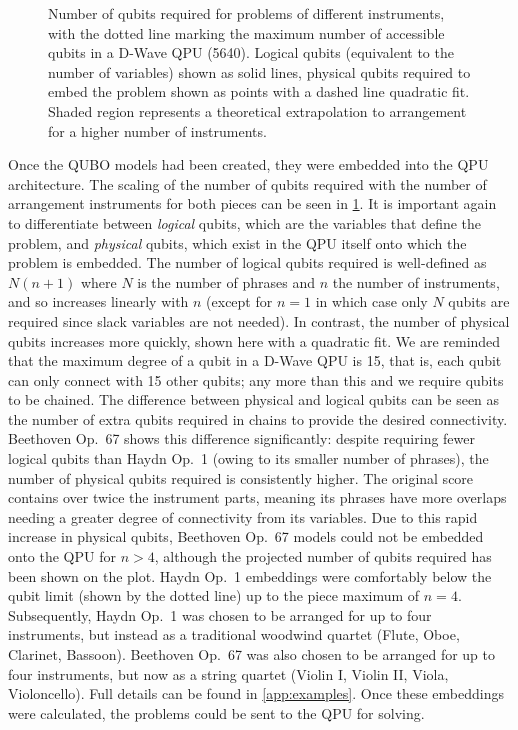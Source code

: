 \documentclass[twocolumn]{article}
\theoremstyle{definition}
\begin{document}
\begin{figure}[!t]
    \centering\footnotesize
    
    \caption{Number of qubits required for problems of different instruments, with the dotted line marking the maximum number of accessible qubits in a D-Wave QPU (\num{5640}). Logical qubits (equivalent to the number of variables) shown as solid lines, physical qubits required to embed the problem shown as points with a dashed line quadratic fit. Shaded region represents a theoretical extrapolation to arrangement for a higher number of instruments.}
    \label{fig:qubits}
\end{figure}

Once the QUBO models had been created, they were embedded into the QPU architecture. The scaling of the number of qubits required with the number of arrangement instruments for both pieces can be seen in \cref{fig:qubits}. It is important again to differentiate between \emph{logical} qubits, which are the variables that define the problem, and \emph{physical} qubits, which exist in the QPU itself onto which the problem is embedded. The number of logical qubits required is well-defined as $N(n+1)$ where $N$ is the number of phrases and $n$ the number of instruments, and so increases linearly with $n$ (except for $n=1$ in which case only $N$ qubits are required since slack variables are not needed). In contrast, the number of physical qubits increases more quickly, shown here with a quadratic fit. We are reminded that the maximum degree of a qubit in a D-Wave QPU is \num{15}, that is, each qubit can only connect with \num{15} other qubits; any more than this and we require qubits to be chained. The difference between physical and logical qubits can be seen as the number of extra qubits required in chains to provide the desired connectivity. Beethoven Op.\ 67 shows this difference significantly: despite requiring fewer logical qubits than Haydn Op.\ 1 (owing to its smaller number of phrases), the number of physical qubits required is consistently higher. The original score contains over twice the instrument parts, meaning its phrases have more overlaps needing a greater degree of connectivity from its variables. Due to this rapid increase in physical qubits, Beethoven Op.\ 67 models could not be embedded onto the QPU for $n>4$, although the projected number of qubits required has been shown on the plot. Haydn Op.\ 1 embeddings were comfortably below the qubit limit (shown by the dotted line) up to the piece maximum of $n=4$. Subsequently, Haydn Op.\ 1 was chosen to be arranged for up to four instruments, but instead as a traditional woodwind quartet (Flute, Oboe, Clarinet, Bassoon). Beethoven Op.\ 67 was also chosen to be arranged for up to four instruments, but now as a string quartet (Violin I, Violin II, Viola, Violoncello). Full details can be found in \cref{app:examples}. Once these embeddings were calculated, the problems could be sent to the QPU for solving.
\end{document}
